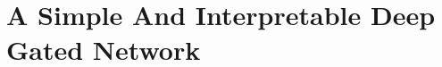 \section{A Simple And Interpretable Deep Gated  Network}\label{sec:interpret}
\begin{figure}[h]
\centering
{}
\end{figure}

